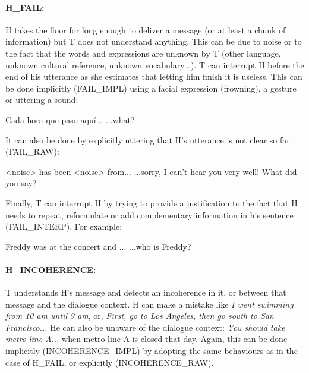         \paragraph{H\_FAIL:} H takes the floor for long enough to deliver a message (or at least a chunk of information) but T does not understand anything. This can be due to noise or to the fact that the words and expressions are unknown by T (other language, unknown cultural reference, unknown vocabulary...). T can interrupt H before the end of his utterance as she estimates that letting him finish it is useless. This can be done implicitly (FAIL\_IMPL) using a facial expression (frowning), a gesture or uttering a sound:
				
					\begin{dialogue}
						 Cada hora que paso aqu\'i...
						 ...what?
					\end{dialogue}
					
					It can also be done by explicitly uttering that H's utterance is not clear so far (FAIL\_RAW):
					
					\begin{dialogue}
						 <noise> has been <noise> from...
						 ...sorry, I can't hear you very well! What did you say?
					\end{dialogue}
					
					Finally, T can interrupt H by trying to provide a justification to the fact that H needs to repeat, reformulate or add complementary information in his sentence (FAIL\_INTERP). For example:
					
					\begin{dialogue}
						 Freddy was at the concert and ...
						 ...who is Freddy?
					\end{dialogue}
					
				\paragraph{H\_INCOHERENCE:} T understands H's message and detects an incoherence in it, or between that message and the dialogue context. H can make a mistake like \textit{I went swimming from 10 am until 9 am}, or, \textit{First, go to Los Angeles, then go south to San Francisco...} He can also be unaware of the dialogue context: \textit{You should take metro line A...} when metro line A is closed that day. Again, this can be done implicitly (INCOHERENCE\_IMPL) by adopting the same behaviours as in the case of H\_FAIL, or explicitly (INCOHERENCE\_RAW).
					
